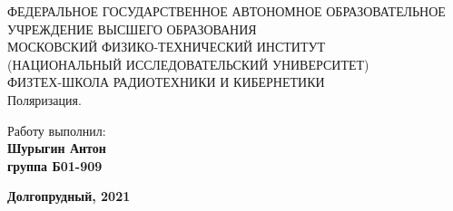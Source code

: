 \begin{center}
    {\small ФЕДЕРАЛЬНОЕ ГОСУДАРСТВЕННОЕ АВТОНОМНОЕ ОБРАЗОВАТЕЛЬНОЕ\\ УЧРЕЖДЕНИЕ ВЫСШЕГО ОБРАЗОВАНИЯ\\ МОСКОВСКИЙ ФИЗИКО-ТЕХНИЧЕСКИЙ ИНСТИТУТ\\ (НАЦИОНАЛЬНЫЙ ИССЛЕДОВАТЕЛЬСКИЙ УНИВЕРСИТЕТ)\\ ФИЗТЕХ-ШКОЛА РАДИОТЕХНИКИ И КИБЕРНЕТИКИ}\\
    \hfill \break
    \hfill \break
    \hfill \break
    \Huge{Поляризация.}\\
\end{center}
  
  \hfill \break
  \hfill \break
  \hfill \break
  \hfill \break
  \hfill \break
  \hfill \break
  
  \begin{flushright}
    \normalsize{Работу выполнил:}\\
    \normalsize{\textbf{Шурыгин Антон \\группа Б01-909}} \\
  \end{flushright}
  
  \begin{center}
    \normalsize{\textbf{Долгопрудный, 2021}}
  \end{center}
  
  
  \thispagestyle{empty} %
  
  
  \newpage
  \thispagestyle{plain}
  \tableofcontents
  \thispagestyle{plain}
  \newpage